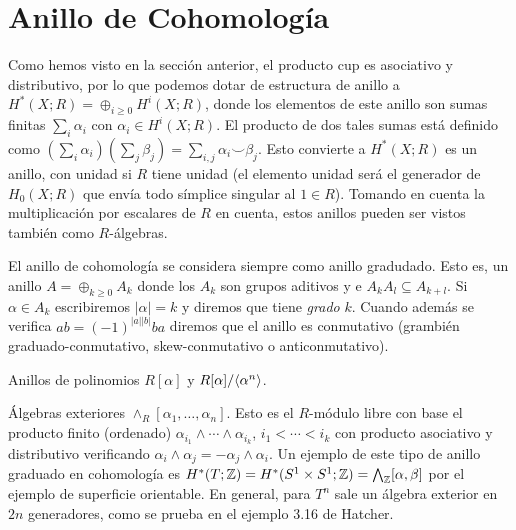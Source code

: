 \documentclass[TA.tex]{subfiles}
\begin{document}
\section{Anillo de Cohomología}
Como hemos visto en la sección anterior, el producto cup es asociativo y distributivo, por lo que podemos dotar de estructura de anillo a $H^*(X;R)=\oplus_{i\geq 0}H^i(X;R)$, donde los elementos de este anillo son sumas finitas $\sum_i\alpha_i$ con $\alpha_i\in H^i(X;R)$. El producto de dos tales sumas está definido como $(\sum_i\alpha_i)(\sum_j\beta_j)=\sum_{i,j}\alpha_i\smile\beta_j$. Esto convierte a $H^*(X;R)$ es un anillo, con unidad si $R$ tiene unidad (el elemento unidad será el generador de $H_0(X;R)$ que envía todo símplice singular al $1\in R$). Tomando en cuenta la multiplicación por escalares de $R$ en cuenta, estos anillos pueden ser vistos también como $R$-álgebras. 

El anillo de cohomología se considera siempre como anillo gradudado. Esto es, un anillo $A=\oplus_{k\geq 0}A_k$ donde los $A_k$ son grupos aditivos y e $A_k A_l\subseteq A_{k+l}$. Si $\alpha\in A_k$ escribiremos $|\alpha|=k$ y diremos que tiene \emph{grado} $k$. Cuando además se verifica $ab=(-1)^{|a||b|}ba$ diremos que el anillo es conmutativo (grambién graduado-conmutativo, skew-conmutativo o anticonmutativo).  

\begin{ej}
Anillos de polinomios $R[\alpha]$ y $R[\alpha]/\langle{\alpha^n}\rangle$. 
\end{ej}

\begin{ej}
Álgebras exteriores $\land_R[\alpha_1,\dots,\alpha_n]$. Esto es el $R$-módulo libre con base el producto finito (ordenado) $\alpha_{i_1}\land\cdots\land\alpha_{i_k}$, $i_1<\cdots<i_k$ con producto asociativo y distributivo verificando $\alpha_i\land\alpha_j=-\alpha_j\land\alpha_i$. Un ejemplo de este tipo de anillo graduado en cohomología es $H^*(T;\mathbb{Z})=H^*(S^1\times S^1;\mathbb{Z})=\bigwedge_{\mathbb{Z}}[\alpha,\beta]$ por el ejemplo de superficie orientable. En general, para  $T^n$ sale un álgebra exterior en $2n$ generadores, como se prueba en el ejemplo 3.16 de Hatcher.   
\end{ej}
\end{document}
